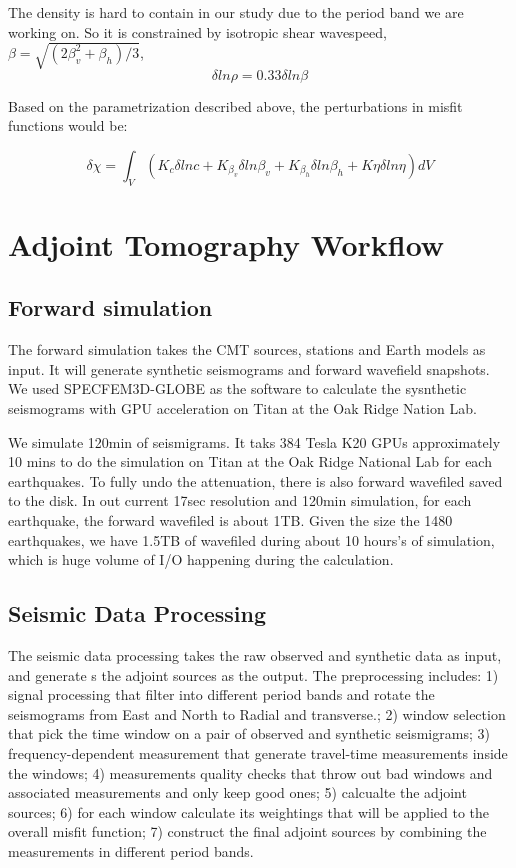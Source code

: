 \documentclass[extra,mreferee]{gji}
\begin{document}
The density is hard to contain in our study due to the period band we are working on. So it is constrained by isotropic shear wavespeed, $\beta = \sqrt{(2\beta_v^2 + \beta_h)/3}$,\\
\begin{equation*}
    \delta ln\rho = 0.33\delta ln\beta
\end{equation*}

Based on the parametrization described above, the perturbations in misfit functions would be:

\begin{equation*}
    \delta \chi = \int_V (K_c\delta lnc + K_{\beta_v}\delta ln\beta_v + K_{\beta_h}\delta ln\beta_h + K\eta \delta ln\eta) dV
\end{equation*}

\section{Adjoint Tomography Workflow}

\subsection{Forward simulation}
The forward simulation takes the CMT sources, stations and Earth models as input. It will generate synthetic seismograms and forward wavefield snapshots. We used SPECFEM3D-GLOBE as the software to calculate the sysnthetic seismograms with GPU acceleration on Titan at the Oak Ridge Nation Lab.

We simulate 120min of seismigrams. It taks 384 Tesla K20 GPUs approximately 10 mins to do the simulation on Titan at the Oak Ridge National Lab for each earthquakes. To fully undo the attenuation, there is also forward wavefiled saved to the disk. In out current 17sec resolution and 120min simulation, for each earthquake, the forward wavefiled is about 1TB. Given the size the 1480 earthquakes, we have 1.5TB of wavefiled during about 10 hours's of simulation, which is huge volume of I/O happening during the calculation.

\subsection{Seismic Data Processing}

The seismic data processing takes the raw observed and synthetic data as input, and generate s the adjoint sources as the output. The preprocessing includes: 1) signal processing that  filter into different period bands and rotate the seismograms from East and North to Radial and transverse.; 2) window selection that pick the time window on a pair of observed and synthetic seismigrams; 3) frequency-dependent measurement that generate travel-time measurements inside the windows; 4) measurements quality checks that throw out bad windows and associated measurements and only keep good ones; 5) calcualte the adjoint sources; 6) for each window calculate its weightings that will be applied to the overall misfit function; 7) construct the final adjoint sources by combining the measurements in different period bands.
\end{document}
